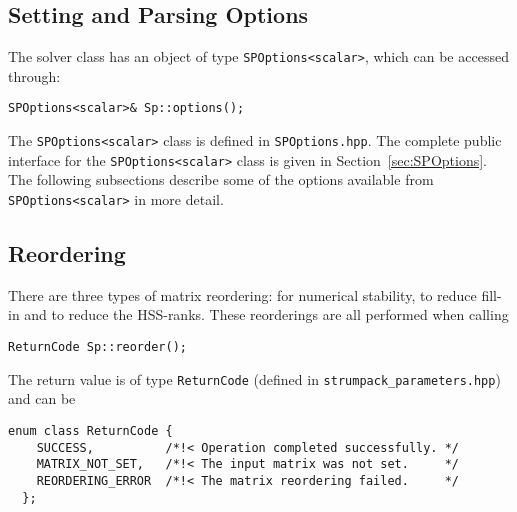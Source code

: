 \documentclass{article}
\begin{document}
\subsection{Setting and Parsing Options}
The solver class has an object of type
\lstinline[style=C]!SPOptions<scalar>!, which can be accessed through:
\begin{lstlisting}[style=C]
  SPOptions<scalar>& Sp::options();
\end{lstlisting}
The \lstinline[style=C]!SPOptions<scalar>! class is defined in
\lstinline[style=Bash]!SPOptions.hpp!. The complete public interface
for the \lstinline[style=C]!SPOptions<scalar>! class is given in
Section~\ref{sec:SPOptions}. The following subsections describe some
of the options available from \lstinline[style=C]!SPOptions<scalar>!
in more detail.


\subsection{Reordering}
There are three types of matrix reordering: for numerical stability,
to reduce fill-in and to reduce the HSS-ranks. These reorderings are
all performed when calling
\begin{lstlisting}[style=C]
  ReturnCode Sp::reorder();
\end{lstlisting}
The return value is of type \lstinline[style=C]!ReturnCode!  (defined
in \lstinline[style=Bash]!strumpack_parameters.hpp!) and can be
\begin{lstlisting}[style=C]
  enum class ReturnCode {
    SUCCESS,          /*!< Operation completed successfully. */
    MATRIX_NOT_SET,   /*!< The input matrix was not set.     */
    REORDERING_ERROR  /*!< The matrix reordering failed.     */
  };
\end{lstlisting}
\end{document}

